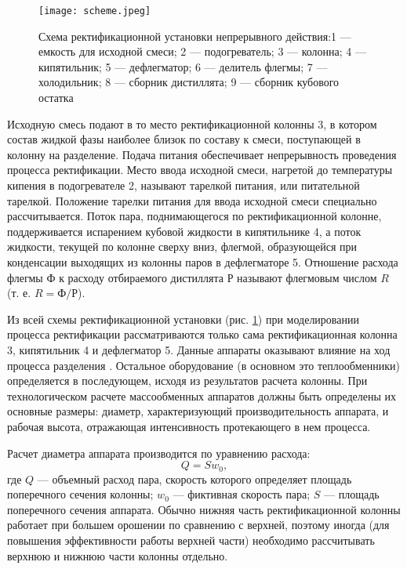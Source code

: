\begin{figure}[h]
	\begin{center}
		\texttt{[image: scheme.jpeg]}
	\end{center}
	\caption{Схема ректификационной установки непрерывного действия:1 --- емкость для исходной смеси; 2 --- подогреватель; 3 --- колонна; 4 --- кипятильник; 5 --- дефлегматор; 6 --- делитель флегмы; 7 --- холодильник; 8 --- сборник дистиллята; 9 --- сборник кубового остатка} \label{fig:rect.scheme}
\end{figure}


Исходную смесь подают в то место ректификационной колонны 3, в котором состав жидкой фазы наиболее близок по составу к смеси, поступающей в колонну на разделение. Подача питания обеспечивает непрерывность проведения процесса ректификации. Место ввода исходной смеси, нагретой до температуры кипения в подогревателе 2, называют тарелкой питания, или питательной тарелкой. Положение тарелки питания для ввода исходной смеси специально рассчитывается. Поток пара, поднимающегося по ректификационной колонне, поддерживается испарением кубовой жидкости в кипятильнике 4, а поток жидкости, текущей по колонне сверху вниз, флегмой, образующейся при конденсации выходящих из колонны паров в дефлегматоре 5. Отношение расхода флегмы $Ф$ к расходу отбираемого дистиллята $Р$ называют флегмовым числом $R$ (т. е. $R = Ф/Р$).

Из всей схемы ректификационной установки (рис. \ref{fig:rect.scheme}) при моделировании процесса ректификации рассматриваются только сама ректификационная колонна 3, кипятильник 4 и дефлегматор 5. Данные аппараты оказывают влияние на ход процесса разделения \cite{klinov-mm2009}. Остальное оборудование (в основном это теплообменники) определяется в последующем, исходя из результатов расчета колонны. При технологическом расчете массообменных аппаратов должны быть определены их основные размеры: диаметр, характеризующий производительность аппарата, и рабочая высота, отражающая интенсивность протекающего в нем процесса.

Расчет диаметра аппарата производится по уравнению расхода:
\begin{equation}
	Q=S w_0,
\end{equation}
где $Q$ --- объемный расход пара, скорость которого определяет площадь поперечного сечения колонны; $w_0$ --- фиктивная скорость пара; $S$ --- площадь поперечного сечения аппарата. Обычно нижняя часть ректификационной колонны работает при большем орошении по сравнению с верхней, поэтому иногда (для повышения эффективности работы верхней части) необходимо рассчитывать верхнюю и нижнюю части колонны отдельно.

